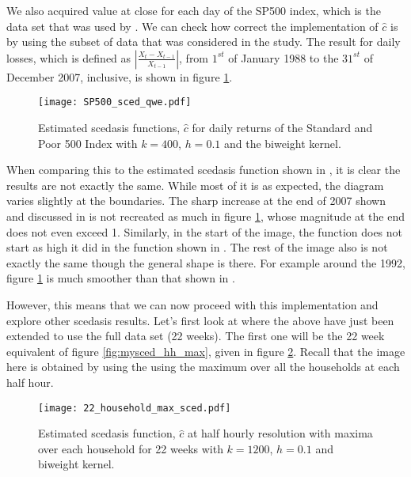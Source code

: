 \documentclass[a4paper]{article}
\begin{document}


We also acquired value at close for each day of the SP500 index, which is the data set that was used by \cite{einmahl16}. We can check how correct the implementation of $\hat{c}$ is by using the subset of data that was considered in the study. The result for daily losses, which is defined as $|\frac{X_t - X_{t-1}}{X_{t-1}}|$, from $1^{st}$ of January 1988 to the $31^{st}$ of December 2007, inclusive, is shown in figure \ref{fig:SP500_sced_daily}.

\begin{figure}
\centering
\texttt{[image: SP500\_sced\_qwe.pdf]}
\caption{\label{fig:SP500_sced_daily} Estimated scedasis functions, $\hat{c}$ for daily returns of the Standard and Poor 500 Index with $k=400$, $h=0.1$ and the biweight kernel.}
\end{figure}

When comparing this to the estimated scedasis function shown in \cite{einmahl16}, it is clear the results are not exactly the same. While most of it is as expected, the diagram varies slightly at the boundaries. The sharp increase at the end of 2007 shown and discussed in \cite{einmahl16} is not recreated as much in figure \ref{fig:SP500_sced_daily}, whose magnitude at the end does not even exceed 1. Similarly, in the start of the image, the function does not start as high it did in the function shown in \cite{einmahl16}. The rest of the image also is not exactly the same though the general shape is there. For example around the 1992, figure \ref{fig:SP500_sced_daily} is much smoother than that shown in \cite{einmahl16}.

However, this means that we can now proceed with this implementation and explore other scedasis results. Let's first look at where the above have just been extended to use the full data set (22 weeks). The first one will be the 22 week equivalent of figure \ref{fig:mysced_hh_max}, given in figure \ref{fig:mysced_hh_max_22}. Recall that the image here is obtained by using the using the maximum over all the households at each half hour.

\begin{figure}
\centering
\texttt{[image: 22\_household\_max\_sced.pdf]}
\caption{\label{fig:mysced_hh_max_22} Estimated scedasis function, $\hat{c}$ at half hourly resolution with maxima over each household for 22 weeks with $k=1200$, $h=0.1$ and biweight kernel.}
\end{figure}
\end{document}
